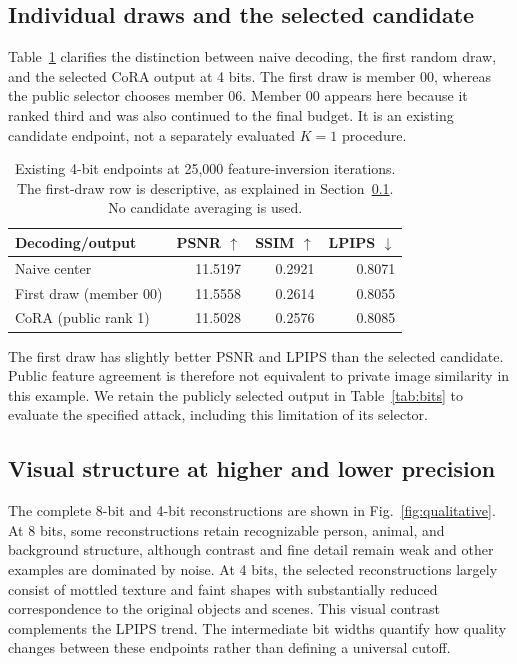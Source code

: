 \documentclass[10pt,twocolumn]{article}
\newcommand{\cora}{CoRA}
\begin{document}
\subsection{Individual draws and the selected candidate}
\label{sec:individual}
Table~\ref{tab:individual} clarifies the distinction between naive
decoding, the first random draw, and the selected \cora{} output at
4 bits. The first draw is member 00, whereas the public selector chooses
member 06. Member 00 appears here because it ranked third and was also
continued to the final budget. It is an existing candidate endpoint,
not a separately evaluated $K=1$ procedure.

\begin{table}[t]
\centering
\caption{Existing 4-bit endpoints at 25,000 feature-inversion iterations.
The first-draw row is descriptive, as explained in
Section~\ref{sec:individual}. No candidate averaging is used.}
\label{tab:individual}
\small
\setlength{\tabcolsep}{3pt}
\begin{tabular}{lrrr}
\toprule
Decoding/output & PSNR $\uparrow$ & SSIM $\uparrow$ & LPIPS $\downarrow$\\
\midrule
Naive center & 11.5197 & 0.2921 & 0.8071\\
First draw (member 00) & 11.5558 & 0.2614 & 0.8055\\
\cora{} (public rank 1) & 11.5028 & 0.2576 & 0.8085\\
\bottomrule
\end{tabular}
\end{table}

The first draw has slightly better PSNR and LPIPS than the selected
candidate. Public feature agreement is therefore not equivalent to
private image similarity in this example. We retain the publicly
selected output in Table~\ref{tab:bits} to evaluate the specified attack,
including this limitation of its selector.

\subsection{Visual structure at higher and lower precision}
\label{sec:qualitative}
The complete 8-bit and 4-bit reconstructions are shown in
Fig.~\ref{fig:qualitative}. At 8 bits, some reconstructions retain
recognizable person, animal, and background structure, although contrast
and fine detail remain weak and other examples are dominated by noise.
At 4 bits, the selected reconstructions largely consist of mottled
texture and faint shapes with substantially reduced correspondence to
the original objects and scenes. This visual contrast complements the
LPIPS trend. The intermediate bit widths quantify how quality changes
between these endpoints rather than defining a universal cutoff.
\end{document}
